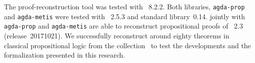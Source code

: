 \documentclass[../main.tex]{subfiles}
\begin{document}
The proof-reconstruction tool \Athena was tested with ~8.2.2.
Both libraries, \verb!agda-prop! and \verb!agda-metis! were tested with
\Agda~2.5.3 and \Agda standard library~0.14.
\Athena jointly with \verb!agda-prop! and \verb!agda-metis! are able to reconstruct propositional proofs of \Metis~2.3 (release~20171021).
We successfully reconstruct around eighty theorems in classical propositional
logic from the \TPTP collection~\cite{Prieto-Cubides2017} to test
the developments and the formalization presented in this research.
\end{document}
